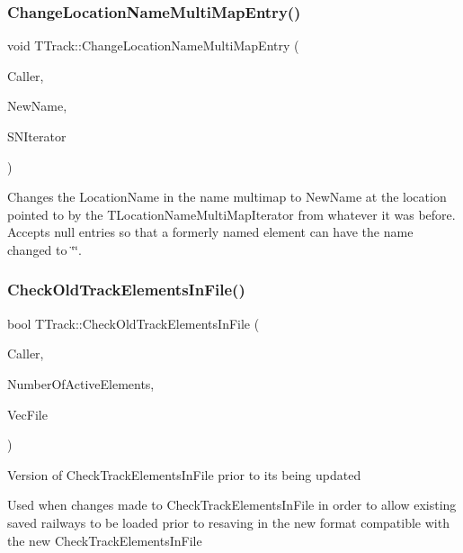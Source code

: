 \subsubsection{\texorpdfstring{Change\+Location\+Name\+Multi\+Map\+Entry()}{ChangeLocationNameMultiMapEntry()}}
{\footnotesize\ttfamily void T\+Track\+::\+Change\+Location\+Name\+Multi\+Map\+Entry (\begin{DoxyParamCaption}\item[{int}]{Caller,  }\item[{Ansi\+String}]{New\+Name,  }\item[{T\+Location\+Name\+Multi\+Map\+Iterator}]{S\+N\+Iterator }\end{DoxyParamCaption})}

Changes the Location\+Name in the name multimap to New\+Name at the location pointed to by the T\+Location\+Name\+Multi\+Map\+Iterator from whatever it was before. Accepts null entries so that a formerly named element can have the name changed to \char`\"{}\char`\"{}. \mbox{\label{class_t_track_a07cde3507d67aff8eac4255ef28fde16}} 
\subsubsection{\texorpdfstring{Check\+Old\+Track\+Elements\+In\+File()}{CheckOldTrackElementsInFile()}}
{\footnotesize\ttfamily bool T\+Track\+::\+Check\+Old\+Track\+Elements\+In\+File (\begin{DoxyParamCaption}\item[{int}]{Caller,  }\item[{int \&}]{Number\+Of\+Active\+Elements,  }\item[{std\+::ifstream \&}]{Vec\+File }\end{DoxyParamCaption})}

Version of Check\+Track\+Elements\+In\+File prior to its being updated

Used when changes made to Check\+Track\+Elements\+In\+File in order to allow existing saved railways to be loaded prior to resaving in the new format compatible with the new Check\+Track\+Elements\+In\+File \mbox{\label{class_t_track_a2095a52c4b914bf6b29529a2d82043e9}} 
